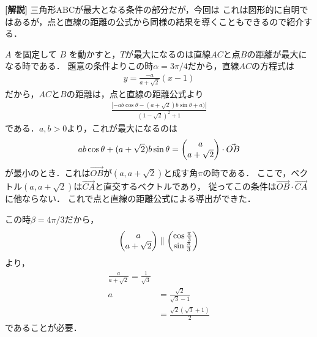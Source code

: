 \documentclass[a4paper,10pt]{ltjsarticle}
\begin{document}
\begin{multicols}{2}
  \vspace{10pt}
  {\bf[解説]}
  三角形ABCが最大となる条件の部分だが，今回は
  これは図形的に自明ではあるが，点と直線の距離の公式から同様の結果を導くこともできるので紹介する．

  $A$ を固定して $B$ を動かすと，$T$が最大になるのは直線$AC$と点$B$の距離が最大になる時である．
  題意の条件よりこの時$\alpha=3\pi/4$だから，直線$AC$の方程式は
  \begin{align*}
    y = \frac{-a}{a+\sqrt{2}}(x-1)
  \end{align*}
  だから，$AC$と$B$の距離は，点と直線の距離公式より
  \begin{align*}
    \frac{\left| -ab\cos\theta - (a+\sqrt{2})b\sin\theta +a)\right|}{(1-\sqrt{2})^2+1}
  \end{align*}
  である．$a,b>0$より，これが最大になるのは
  \begin{align*}
    ab\cos\theta + (a+\sqrt{2})b\sin\theta = \mqty(a \\ a+\sqrt{2}) \cdot \vec{OB}
  \end{align*}
  が最小のとき．これは$\vec{OB}$が$(a,a+\sqrt{2})$と成す角$\pi$の時である．
  ここで，ベクトル$(a,a+\sqrt{2})$は$\vec{CA}$と直交するベクトルであり，
  従ってこの条件は$\vec{OB}\cdot\vec{CA}$に他ならない．
  これで点と直線の距離公式による導出ができた．

  この時$\beta=4\pi/3$だから，
  \begin{align*}
    \mqty(a \\ a+\sqrt{2}) \parallel \mqty(\cos\frac{\pi}{3} \\ \sin\frac{\pi}{3})
  \end{align*}
  より，
  \begin{align*}
    \frac{a}{a+\sqrt{2}} = \frac{1}{\sqrt{3}} \\
    a & = \frac{\sqrt{2}}{\sqrt{3}-1}         \\
      & = \frac{\sqrt{2}(\sqrt{3}+1)}{2}
  \end{align*}
  であることが必要．

  \newpage
\end{multicols}
\end{document}
